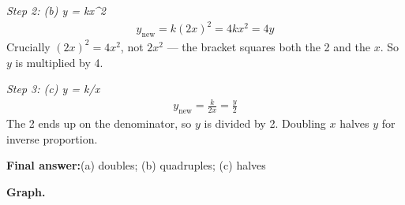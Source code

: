 \documentclass[11pt]{article}
\begin{document}
\textit{Step 2: (b) y = kx\textasciicircum 2}
\[\begin{gathered}
y_{\text{new}} = k(2x)^2 = 4kx^2 = 4y
\end{gathered}\]
Crucially \( (2x)^2 = 4x^2 \), not \( 2x^2 \) --- the bracket squares both the 2 and the \( x \). So \( y \) is multiplied by 4.

\textit{Step 3: (c) y = k/x}
\[\begin{gathered}
y_{\text{new}} = \frac{k}{2x} = \frac{y}{2}
\end{gathered}\]
The 2 ends up on the denominator, so \( y \) is divided by 2. Doubling \( x \) halves \( y \) for inverse proportion.

\begin{answerbox}
\textbf{Final answer:}\quad (a) doubles; (b) quadruples; (c) halves
\end{answerbox}
\textbf{Graph.}
\end{document}
